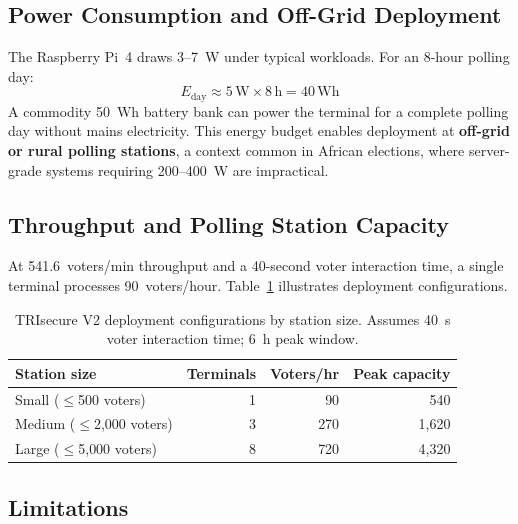 \documentclass[submission]{sacjsub}
\begin{document}
\subsection{Power Consumption and Off-Grid Deployment}\label{sec:power}

The Raspberry Pi~4 draws 3--7~W under typical workloads. For an
8-hour polling day:
\begin{equation}
  E_{\mathrm{day}} \approx 5\,\mathrm{W} \times 8\,\mathrm{h} = 40\,\mathrm{Wh}
\end{equation}
A commodity 50~Wh battery bank can power the terminal for a complete
polling day without mains electricity. This energy budget enables
deployment at \textbf{off-grid or rural polling stations}, a context
common in African elections, where server-grade systems requiring
200--400~W are impractical.

\subsection{Throughput and Polling Station Capacity}

At 541.6~voters/min throughput and a 40-second voter interaction time,
a single terminal processes 90~voters/hour. Table~\ref{tab:throughput}
illustrates deployment configurations.

\begin{table}[t]
\caption{TRIsecure V2 deployment configurations by station size.
  Assumes 40~s voter interaction time; 6~h peak window.}
\label{tab:throughput}
\begin{tabular}{|l|r|r|r|}
  \hline
  Station size & Terminals & Voters/hr & Peak capacity \\
  \hline
  Small  ($\leq$500 voters)     & 1 & 90  & 540  \\
  Medium ($\leq$2{,}000 voters) & 3 & 270 & 1{,}620 \\
  Large  ($\leq$5{,}000 voters) & 8 & 720 & 4{,}320 \\
  \hline
\end{tabular}
\end{table}

\subsection{Limitations}\label{sec:limitations}
\end{document}
